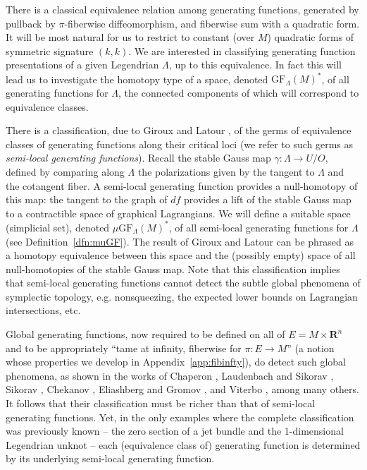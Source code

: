 \documentclass[12pt,a4paper]{article}
\numberwithin{equation}{section}
\theoremstyle{definition}
\theoremstyle{remark}
\newcommand{\R}{\mathbf{R}}
\newcommand{\GF}{\mathrm{GF}}
\begin{document}
There is a classical equivalence relation among generating functions, generated by pullback by $\pi$-fiberwise diffeomorphism, and fiberwise sum with a  quadratic form.  It will be most natural for us to restrict to constant (over $M$) quadratic forms of symmetric signature $(k,k)$.
We are interested in classifying generating function presentations of a given Legendrian $\Lambda$, up to this equivalence. In fact this will lead
us to investigate the homotopy type of a space, denoted $\GF_\Lambda(M)^*$, of all generating functions for $\Lambda$, the connected components
of which will correspond to equivalence classes.

\vspace{2mm}

There is a classification, due to Giroux \cite{Giroux} and Latour \cite{Latour},
of the germs of  equivalence classes of generating functions  along  their critical loci (we refer to such germs as {\em semi-local generating functions}).  Recall the stable Gauss map $\gamma: \Lambda \to U/O$, defined by comparing along $\Lambda$ the polarizations given by the tangent to $\Lambda$ and the cotangent fiber.
A semi-local generating function provides a null-homotopy of this map: the tangent to the graph of $df$ provides a lift of the stable Gauss map to a contractible space of graphical Lagrangians.   We will define a suitable space (simplicial set), denoted $\mu\GF_\Lambda(M)^*$,
of all semi-local generating functions for $\Lambda$ (see Definition~\ref{dfn:muGF}). The result of Giroux and Latour can be phrased as
a homotopy equivalence between this space and the (possibly empty) space of all null-homotopies of the stable Gauss map.
Note that this classification implies that semi-local generating functions cannot detect the subtle global phenomena of symplectic topology, e.g. nonsqueezing, the expected lower bounds on Lagrangian intersections, etc.

Global generating functions, now required to be defined on all of $E = M \times \R^n$ and to be appropriately ``tame at infinity, fiberwise for $\pi: E \to M$''  (a notion whose properties we develop in Appendix~\ref{app:fibinfty}), do detect such global phenomena, as shown in the  works of Chaperon \cite{Chaperon}, Laudenbach and Sikorav \cite{Laudenbach-Sikorav}, Sikorav \cite{Sikorav}, Chekanov \cite{Chekanov},  Eliashberg and Gromov \cite{Eliashberg-Gromov}, and Viterbo \cite{Viterbo}, among many others.  It follows that their classification must be richer than that of semi-local generating functions.  Yet, in the only examples where the complete classification was previously known -- the zero section of a jet bundle \cite{Viterbo, Theret-viterbo-uniqueness} and the 1-dimensional Legendrian unknot \cite{Jordan-Traynor} --  each (equivalence class of) generating function is determined by its underlying semi-local generating function.
\end{document}
